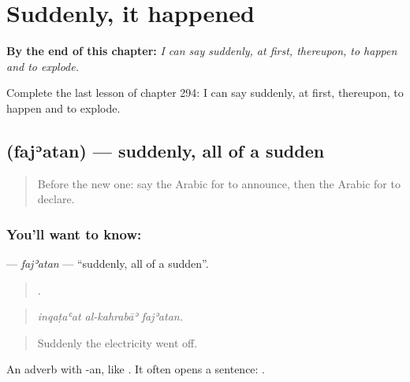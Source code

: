 
\chapter{Suddenly, it happened}
\label{ch:ar-suddenly-it-happened}

\begin{chapteropening}
\textbf{By the end of this chapter:} \emph{I can say suddenly, at first, thereupon, to happen and to explode.}

Complete the last lesson of chapter 294: I can say suddenly, at first, thereupon, to happen and to explode.
\end{chapteropening}

\section[\texorpdfstring{\ar{فجأة} (fajʾatan)}{فجأة (fajʾatan)}]{ (fajʾatan) — suddenly, all of a sudden}

\label{lesson:AR-C294-fajatan}



\begin{quote}
Before the new one: say the Arabic for to announce, then the Arabic for to declare.
\end{quote}

\subsection*{You'll want to know: }
\textbf{} — \emph{fajʾatan} — \textquotedblleft{}suddenly, all of a sudden\textquotedblright{}.

\begin{quote}
  .
\end{quote}

\begin{quote}
\emph{inqaṭaʿat al-kahrabāʾ fajʾatan.}
\end{quote}

\begin{quote}
Suddenly the electricity went off.
\end{quote}

An adverb with -an, like . It often opens a sentence:   .

